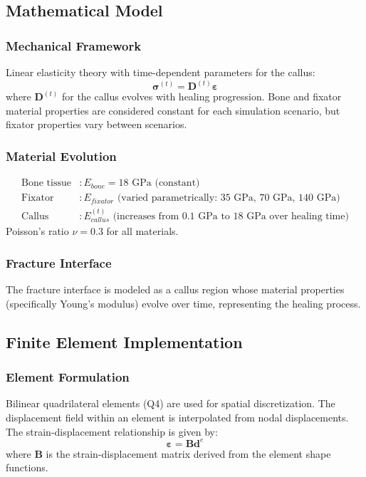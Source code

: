 \documentclass{article}
\begin{document}
\subsection{Mathematical Model}

\subsubsection{Mechanical Framework}

Linear elasticity theory with time-dependent parameters for the callus:
\[
  \bm{\sigma}^{(t)} = \mathbf{D}^{(t)}\bm{\varepsilon}
\]
where $\mathbf{D}^{(t)}$ for the callus evolves with healing progression. Bone and fixator material properties are considered constant for each simulation scenario, but fixator properties vary between scenarios.
\subsubsection{Material Evolution}
\begin{align*}
  \text{Bone tissue} & : E_{bone} = 18 \text{ GPa (constant)}                                          \\
  \text{Fixator}     & : E_{fixator} \text{ (varied parametrically: 35 GPa, 70 GPa, 140 GPa)}          \\
  \text{Callus}      & : E_{callus}^{(t)} \text{ (increases from 0.1 GPa to 18 GPa over healing time)}
\end{align*}
Poisson's ratio $\nu = 0.3$ for all materials.

\subsubsection{Fracture Interface}
The fracture interface is modeled as a callus region whose material properties (specifically Young's modulus) evolve over time, representing the healing process.

\subsection{Finite Element Implementation}

\subsubsection{Element Formulation}
Bilinear quadrilateral elements (Q4) are used for spatial discretization. The displacement field within an element is interpolated from nodal displacements.
The strain-displacement relationship is given by:
\[
  \bm{\varepsilon} = \mathbf{B}\mathbf{d}^e
\]
where $\mathbf{B}$ is the strain-displacement matrix derived from the element shape functions.
\end{document}

